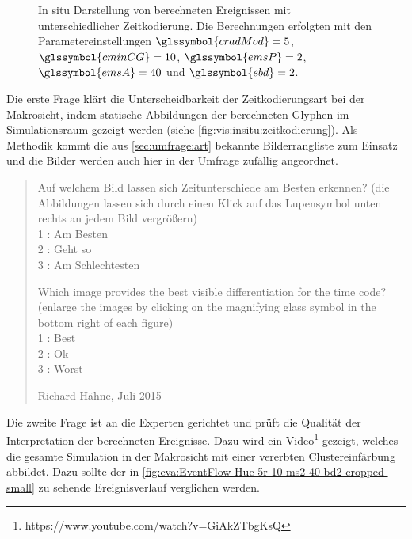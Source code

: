 \begin{figure}
	{\caption{In situ Darstellung von berechneten Ereignissen mit unterschiedlicher Zeitkodierung. Die Berechnungen erfolgten mit den Parametereinstellungen $\glssymbol{cradMod} = 5$, $\glssymbol{cminCG} = 10$,  $\glssymbol{emsP} = 2$,  $\glssymbol{emsA} = 40$ und $\glssymbol{ebd} = 2$.}\label{fig:vis:insitu:zeitkodierung}}
\end{figure}

Die erste Frage klärt die Unterscheidbarkeit der Zeitkodierungsart bei der Makrosicht, indem statische Abbildungen der berechneten Glyphen im Simulationsraum gezeigt werden (siehe \autoref{fig:vis:insitu:zeitkodierung}). Als Methodik kommt die aus \autoref{sec:umfrage:art} bekannte Bilderrangliste zum Einsatz und die Bilder werden auch hier in der Umfrage zufällig angeordnet.

\blockquote[Richard Hähne, Juli 2015]{
	Auf welchem Bild lassen sich Zeitunterschiede am Besten erkennen? (die Abbildungen lassen sich durch einen Klick auf das Lupensymbol unten rechts an jedem Bild vergrößern)\\
	1 : Am Besten\\
	2 : Geht so\\
	3 : Am Schlechtesten
	
	Which image provides the best visible differentiation for the time code? (enlarge the images by clicking on the magnifying glass symbol in the bottom right of each figure)\\
	1 : Best\\
	2 : Ok\\
	3 : Worst
}

Die zweite Frage ist an die Experten gerichtet und prüft die Qualität der Interpretation der berechneten Ereignisse. Dazu wird \href{https://www.youtube.com/watch?v=GiAkZTbgKsQ}{ein Video}\footnote{https://www.youtube.com/watch?v=GiAkZTbgKsQ} gezeigt, welches die gesamte Simulation in der Makrosicht mit einer vererbten Clustereinfärbung abbildet. Dazu sollte der in \autoref{fig:eva:EventFlow-Hue-5r-10-ms2-40-bd2-cropped-small} zu sehende Ereignisverlauf verglichen werden.


